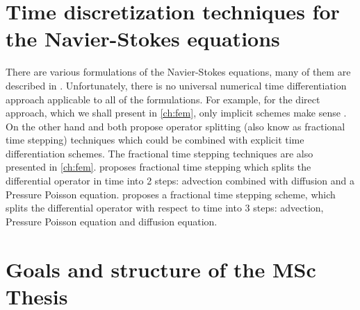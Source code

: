 \section{Time discretization techniques for the Navier-Stokes equations}
There are various formulations of the Navier-Stokes equations, many of them are described in \cite{gresho-fem}. Unfortunately, there is no universal numerical time differentiation approach applicable to all of the formulations. For example, for the direct approach, which we shall present in \cref{ch:fem}, only implicit schemes make sense \cite{gresho-fem}. On the other hand \cite{Chorin-operator-split} and \cite{Bridson} both propose operator splitting (also know as fractional time stepping) techniques which could be combined with explicit time differentiation schemes. The fractional time stepping techniques are also presented in \cref{ch:fem}. \cite{Chorin-operator-split} proposes fractional time stepping which splits the differential operator in time into 2 steps: advection combined with diffusion and a Pressure Poisson equation. \cite{Bridson} proposes a fractional time stepping scheme, which splits the differential operator with respect to time into 3 steps: advection, Pressure Poisson equation and diffusion equation.

\section{Goals and structure of the MSc Thesis}

